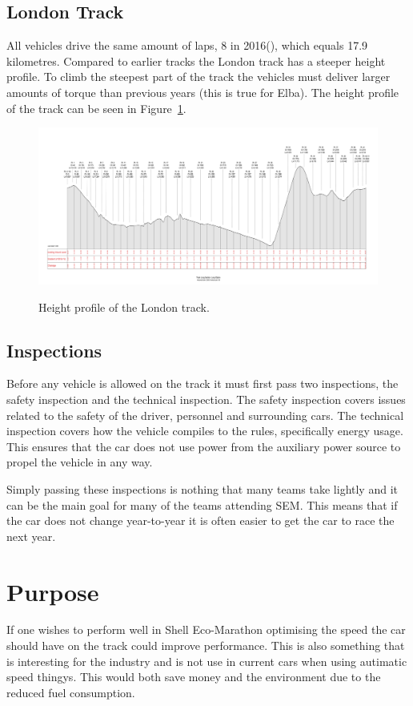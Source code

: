 \subsection{London Track}
All vehicles drive the same amount of laps, 8 in 2016(\cite{semrules16c2}),
which equals 17.9 kilometres. Compared to earlier tracks the London track has a
steeper height profile. To climb the steepest part of the track the vehicles
must deliver larger amounts of torque than previous years (this is true for
Elba). The height profile of the track can be seen in
Figure~\ref{fig:introduction_londontrack}.
\begin{figure}[H]
    \centering\label{fig:introduction_londontrack}
    \includegraphics[width=\textwidth]{./img/introduction_londontrack.png}
    \caption{Height profile of the London track.}
\end{figure}

\subsection{Inspections}
Before any vehicle is allowed on the track it must first pass two inspections,
the safety inspection and the technical inspection. The safety inspection covers
issues related to the safety of the driver, personnel and surrounding cars. 
The technical inspection covers how the vehicle compiles to the rules,
specifically energy usage. This ensures that the car does not use power from the
auxiliary power source to propel the vehicle in any way.

Simply passing these inspections is nothing that many teams take lightly and it
can be the main goal for many of the teams attending SEM\@. This means that
if the car does not change year-to-year it is often easier to get the car to
race the next year.

\section{Purpose}
If one wishes to perform well in Shell Eco-Marathon optimising the speed the car should have on the track could improve performance. 
This is also something that is interesting for the industry and is not use in current cars when using autimatic speed thingys. This would both save money and the environment due to the reduced fuel consumption.

